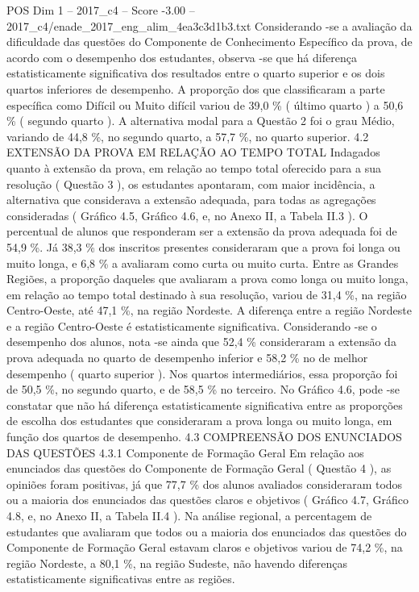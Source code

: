 \begin{textsample}{POS Dim 1 – 2017\_c4 – Score -3.00 – 2017\_c4/enade\_2017\_eng\_alim\_4ea3c3d1b3.txt}
Considerando -se a avaliação da dificuldade das questões do Componente de Conhecimento Específico da prova, de acordo com o desempenho dos estudantes, observa -se que há diferença estatisticamente significativa dos resultados entre o quarto superior e os dois quartos inferiores de desempenho.
A proporção dos que classificaram a parte específica como Difícil ou Muito difícil variou de 39,0 \% ( último quarto ) a 50,6 \% ( segundo quarto ).
A alternativa modal para a Questão 2 foi o grau Médio, variando de 44,8 \%, no segundo quarto, a 57,7 \%, no quarto superior. 4.2 EXTENSÃO DA PROVA EM RELAÇÃO AO TEMPO TOTAL Indagados quanto à extensão da prova, em relação ao tempo total oferecido para a sua resolução ( Questão 3 ), os estudantes apontaram, com maior incidência, a alternativa que considerava a extensão adequada, para todas as agregações consideradas ( Gráfico 4.5, Gráfico 4.6, e, no Anexo II, a Tabela II.3 ).
O percentual de alunos que responderam ser a extensão da prova adequada foi de 54,9 \%.
Já 38,3 \% dos inscritos presentes consideraram que a prova foi longa ou muito longa, e 6,8 \% a avaliaram como curta ou muito curta.
Entre as Grandes Regiões, a proporção daqueles que avaliaram a prova como longa ou muito longa, em relação ao tempo total destinado à sua resolução, variou de 31,4 \%, na região Centro-Oeste, até 47,1 \%, na região Nordeste.
A diferença entre a região Nordeste e a região Centro-Oeste é estatisticamente significativa.
Considerando -se o desempenho dos alunos, nota -se ainda que 52,4 \% consideraram a extensão da prova adequada no quarto de desempenho inferior e 58,2 \% no de melhor desempenho ( quarto superior ).
Nos quartos intermediários, essa proporção foi de 50,5 \%, no segundo quarto, e de 58,5 \% no terceiro.
No Gráfico 4.6, pode -se constatar que não há diferença estatisticamente significativa entre as proporções de escolha dos estudantes que consideraram a prova longa ou muito longa, em função dos quartos de desempenho. 4.3 COMPREENSÃO DOS ENUNCIADOS DAS QUESTÕES 4.3.1 Componente de Formação Geral Em relação aos enunciados das questões do Componente de Formação Geral ( Questão 4 ), as opiniões foram positivas, já que 77,7 \% dos alunos avaliados consideraram todos ou a maioria dos enunciados das questões claros e objetivos ( Gráfico 4.7, Gráfico 4.8, e, no Anexo II, a Tabela II.4 ).
Na análise regional, a percentagem de estudantes que avaliaram que todos ou a maioria dos enunciados das questões do Componente de Formação Geral estavam claros e objetivos variou de 74,2 \%, na região Nordeste, a 80,1 \%, na região Sudeste, não havendo diferenças estatisticamente significativas entre as regiões.

\end{textsample}
